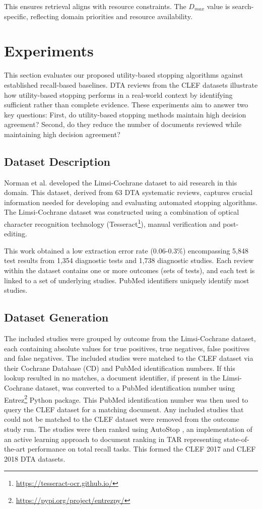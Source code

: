 \documentclass[sigconf,natbib=true,anonymous=true]{acmart}
\begin{document}
This ensures retrieval aligns with resource constraints. The $D_{max}$ value is search-specific, reflecting domain priorities and resource availability.

\section{Experiments}
This section evaluates our proposed utility-based stopping algorithms against established recall-based baselines. DTA reviews from the CLEF datasets illustrate how utility-based stopping performs in a real-world context by identifying sufficient rather than complete evidence. These experiments aim to answer two key questions: First, do utility-based stopping methods maintain high decision agreement? Second, do they reduce the number of documents reviewed while maintaining high decision agreement?
\subsection{Dataset Description}

Norman et al. \cite{norman2018data} developed the Limsi-Cochrane dataset to aid research in this domain. This dataset, derived from 63 DTA systematic reviews, captures crucial information needed for developing and evaluating automated stopping algorithms. The Limsi-Cochrane dataset was constructed using a combination of optical character recognition technology (Tesseract\footnote{\url{https://tesseract-ocr.github.io/}}), manual verification and post-editing.

This work obtained a low extraction error rate (0.06-0.3\%) encompassing 5,848 test results from 1,354 diagnostic tests and 1,738 diagnostic studies. Each review within the dataset contains one or more outcomes (sets of tests), and each test is linked to a set of underlying studies. PubMed identifiers uniquely identify most studies.

\subsection{Dataset Generation}

The included studies were grouped by outcome from the Limsi-Cochrane dataset, each containing absolute values for true positives, true negatives, false positives and false negatives. The included studies were matched to the CLEF dataset via their Cochrane Database (CD) and PubMed identification numbers. If this lookup resulted in no matches, a document identifier, if present in the Limsi-Cochrane dataset, was converted to a PubMed identification number using Entrez\footnote{\url{https://pypi.org/project/entrezpy/}} Python package. This PubMed identification number was then used to query the CLEF dataset for a matching document. Any included studies that could not be matched to the CLEF dataset were removed from the outcome study run. The studies were then ranked using AutoStop \cite{li2020stop}, an implementation of an active learning approach to document ranking in TAR \cite{Cormack2015} representing state-of-the-art performance on total recall tasks. This formed the CLEF 2017 and CLEF 2018 DTA datasets.
\end{document}
